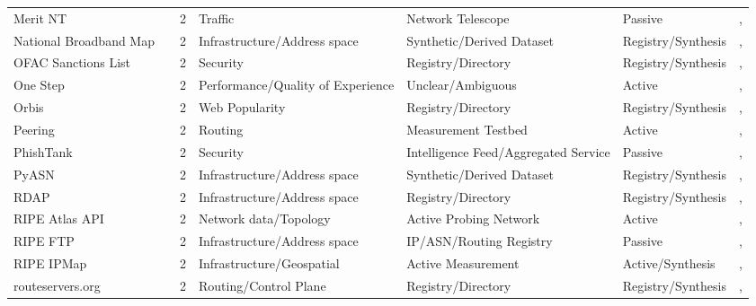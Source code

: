 \documentclass[11pt,a4paper]{article}
\begin{document}
\begin{longtable}{@{}p{}p{}p{}p{}p{}p{}p{}@{}}
Merit NT & \cite{11267522} & 2 & Traffic & Network Telescope & Passive & \cite{10.1145/3777912.3839790}, \cite{10.1007/978-3-032-18268-5_14} \\
National Broadband Map & \cite{national_broadband_map} & 2 & Infrastructure/Address space & Synthetic/Derived Dataset & Registry/Synthesis & \cite{10.1145/3646547.3688441}, \cite{10.1007/978-3-031-85960-1_20} \\
OFAC Sanctions List & \cite{ofac} & 2 & Security & Registry/Directory & Registry/Synthesis & \cite{10.1145/3618257.3624824}, \cite{10.1145/3517745.3561423} \\
One Step & \cite{one_step_measurement} & 2 & Performance/Quality of Experience & Unclear/Ambiguous & Active & \cite{10.1145/3618257.3624838}, \cite{10.1007/978-3-030-98785-5_10} \\
Orbis & \cite{orbis_database} & 2 & Web Popularity & Registry/Directory & Registry/Synthesis & \cite{10.1145/3487552.3487822}, \cite{10.1007/978-3-030-98785-5_30} \\
Peering & \cite{10.1145/3359989.3365414} & 2 & Routing & Measurement Testbed & Active & \cite{10.1145/3517745.3561421}, \cite{10.1007/978-3-032-18268-5_3} \\
PhishTank & \cite{phishtank} & 2 & Security & Intelligence Feed/Aggregated Service & Passive & \cite{10.1145/3487552.3487857}, \cite{10.1007/978-3-031-28486-1_24} \\
PyASN & \cite{pyasn} & 2 & Infrastructure/Address space & Synthetic/Derived Dataset & Registry/Synthesis & \cite{10.1145/3487552.3487854}, \cite{10.1007/978-3-031-85960-1_9} \\
RDAP & \cite{rdap_ietf} & 2 & Infrastructure/Address space & Registry/Directory & Registry/Synthesis & \cite{10.1007/978-3-031-56249-5_9}, \cite{10.1007/978-3-031-56249-5_10} \\
RIPE Atlas API & \cite{atlasapi} & 2 & Network data/Topology & Active Probing Network & Active & \cite{10.1145/3777912.3839804}, \cite{10.1145/3777912.3809149} \\
RIPE FTP & \cite{ripeftp} & 2 & Infrastructure/Address space & IP/ASN/Routing Registry & Passive & \cite{10.1145/3730567.3764452}, \cite{10.1145/3618257.3624815} \\
RIPE IPMap & \cite{ipmap} & 2 & Infrastructure/Geospatial & Active Measurement & Active/Synthesis & \cite{10.1145/3730567.3764427}, \cite{10.1145/3777912.3839804} \\
routeservers.org & \cite{routeservers} & 2 & Routing/Control Plane & Registry/Directory & Registry/Synthesis & \cite{10.1145/3618257.3624812}, \cite{10.1007/978-3-031-85960-1_15} \\

\end{longtable}
\end{document}
